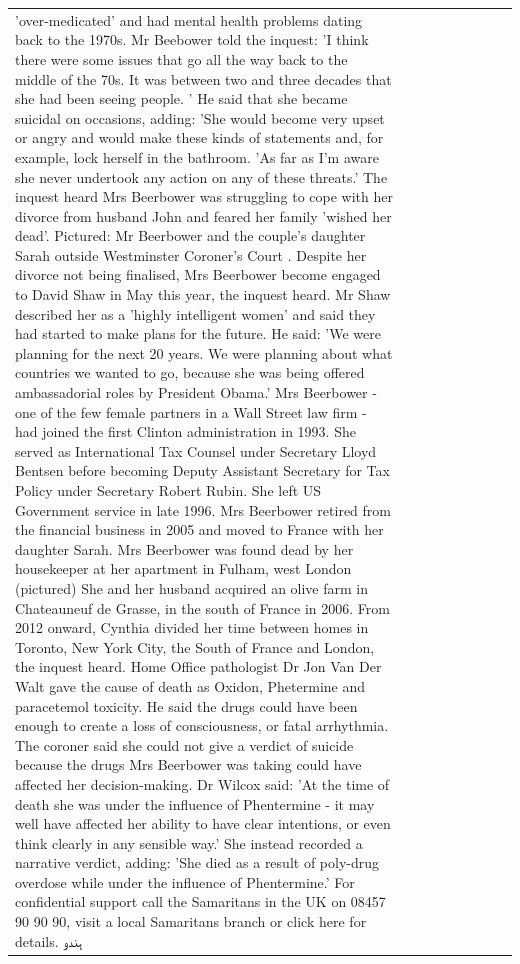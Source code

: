 \begin{table}[H]
\begin{tabular}{lllrlllll}
'over-medicated' and had mental health problems dating back to the 1970s. Mr Beebower told the inquest: 'I think there were some issues that go all the way back to the middle of the 70s. It was between two and three decades that she had been seeing people. ' He said that she became suicidal on occasions, adding: 'She would become very upset or angry and would make these kinds of statements and, for example, lock herself in the bathroom. 'As far as I'm aware she never undertook any action on any of these threats.' The inquest heard Mrs Beerbower was struggling to cope with her divorce from husband John and feared her family 'wished her dead'. Pictured: Mr Beerbower and the couple's daughter Sarah outside Westminster Coroner's Court . Despite her divorce not being finalised, Mrs Beerbower become engaged to David Shaw in May this year, the inquest heard. Mr Shaw described her as a 'highly intelligent women' and said they had started to make plans for the future. He said: 'We were planning for the next 20 years. We were planning about what countries we wanted to go, because she was being offered ambassadorial roles by President Obama.' Mrs Beerbower - one of the few female partners in a Wall Street law firm - had joined the first Clinton administration in 1993. She served as International Tax Counsel under Secretary Lloyd Bentsen before becoming Deputy Assistant Secretary for Tax Policy under Secretary Robert Rubin. She left US Government service in late 1996. Mrs Beerbower retired from the financial business in 2005 and moved to France with her daughter Sarah. Mrs Beerbower was found dead by her housekeeper at her apartment in Fulham, west London (pictured) She and her husband acquired an olive farm in Chateauneuf de Grasse, in the south of France in 2006. From 2012 onward, Cynthia divided her time between homes in Toronto, New York City, the South of France and London, the inquest heard. Home Office pathologist Dr Jon Van Der Walt gave the cause of death as Oxidon, Phetermine and paracetemol toxicity. He said the drugs could have been enough to create a loss of consciousness, or fatal arrhythmia. The coroner said she could not give a verdict of suicide because the drugs Mrs Beerbower was taking could have affected her decision-making. Dr Wilcox said: 'At the time of death she was under the influence of Phentermine - it may well have affected her ability to have clear intentions, or even think clearly in any sensible way.' She instead recorded a narrative verdict, adding: 'She died as a result of poly-drug overdose while under the influence of Phentermine.' For confidential support call the Samaritans in the UK on 08457 90 90 90, visit a local Samaritans branch or click here for details. ہندو \\

\end{tabular}
\end{table}
